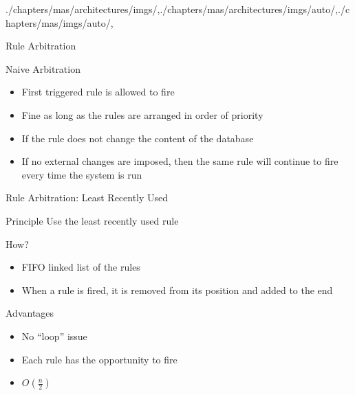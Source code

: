 \begin{graphicspathcontext}{{./chapters/mas/architectures/imgs/},{./chapters/mas/architectures/imgs/auto/},{./chapters/mas/imgs/auto/},\old}
\begin{frame}{Rule Arbitration}
	\vspace{.5cm}
	\vspace{.4cm}
	\begin{alertblock}{Naive Arbitration}
			\begin{itemize}
				\item First triggered rule is allowed to fire
				\item Fine as long as the rules are arranged in order of priority
			\end{itemize}
	\end{alertblock}
	\begin{example}[of problem]
		\begin{itemize}
		\item If the rule does not change the content of the database
		\item If no external changes are imposed, then the same rule will continue to fire every time the system is run
		\end{itemize}
	\end{example}
\end{frame}

\begin{frame}{{Rule Arbitration:} Least Recently Used}
	\begin{block}{Principle}
		Use the least recently used rule
	\end{block}
	\begin{block}{How?}
		\begin{itemize}
			\item FIFO linked list of the rules
			\item When a rule is fired, it is removed from its position and added to the end
		\end{itemize}
	\end{block}
	\begin{alertblock}{Advantages}
		\begin{itemize}
			\item No ``loop'' issue
			\item Each rule has the opportunity to fire
			\item $O(\frac{n}{2})$
		\end{itemize}
	\end{alertblock}
\end{frame}


\end{graphicspathcontext}
